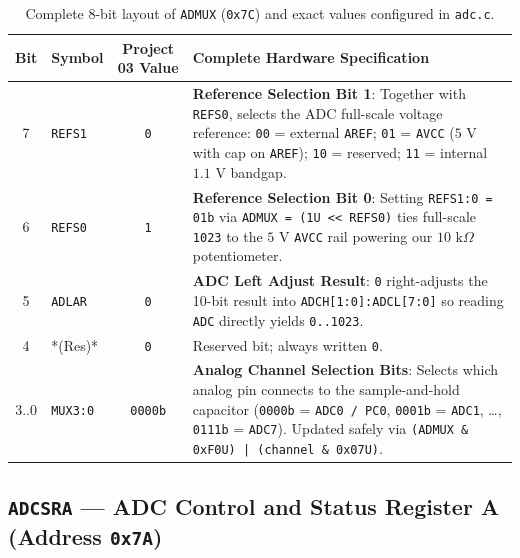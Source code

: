 \documentclass[11pt,a4paper,oneside]{report}
\begin{document}
\begin{table}[!htbp]
\centering
\caption{Complete 8-bit layout of \texttt{ADMUX} (\texttt{0x7C}) and exact values configured in \texttt{adc.c}.}
\label{tab:ch3_admux}
\begin{tabularx}{\linewidth}{c l c X}
\toprule
\textbf{Bit} & \textbf{Symbol} & \textbf{Project 03 Value} & \textbf{Complete Hardware Specification} \\
\midrule
7 & \texttt{REFS1} & \texttt{0} & \textbf{Reference Selection Bit 1}: Together with \texttt{REFS0}, selects the ADC full-scale voltage reference: \texttt{00} = external \texttt{AREF}; \texttt{01} = \texttt{AVCC} ($5\text{ V}$ with cap on \texttt{AREF}); \texttt{10} = reserved; \texttt{11} = internal $1.1\text{ V}$ bandgap. \\
6 & \texttt{REFS0} & \texttt{1} & \textbf{Reference Selection Bit 0}: Setting \texttt{REFS1:0 = 01b} via \texttt{ADMUX = (1U << REFS0)} ties full-scale \texttt{1023} to the $5\text{ V}$ \texttt{AVCC} rail powering our $10\text{ k}\Omega$ potentiometer. \\
5 & \texttt{ADLAR} & \texttt{0} & \textbf{ADC Left Adjust Result}: \texttt{0} right-adjusts the 10-bit result into \texttt{ADCH[1:0]:ADCL[7:0]} so reading \texttt{ADC} directly yields \texttt{0..1023}. \\
4 & *(Res)* & \texttt{0} & Reserved bit; always written \texttt{0}. \\
3..0 & \texttt{MUX3:0} & \texttt{0000b} & \textbf{Analog Channel Selection Bits}: Selects which analog pin connects to the sample-and-hold capacitor (\texttt{0000b} = \texttt{ADC0 / PC0}, \texttt{0001b} = \texttt{ADC1}, \dots, \texttt{0111b} = \texttt{ADC7}). Updated safely via \texttt{(ADMUX \& 0xF0U) | (channel \& 0x07U)}. \\
\bottomrule
\end{tabularx}
\end{table}

\subsection{\texttt{ADCSRA} --- ADC Control and Status Register A (Address \texttt{0x7A})}
\end{document}
